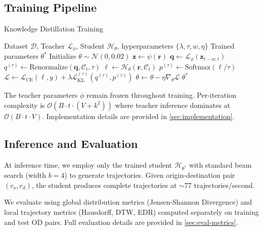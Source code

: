 \subsection{Training Pipeline}
\label{sec:method-training}

\begin{algorithm}[t]
    \caption{Knowledge Distillation Training}
    \label{alg:distillation}
    \begin{algorithmic}[1]
        \Require Dataset $\mathcal{D}$, Teacher $\mathcal{L}_\phi$, Student $\mathcal{H}_\theta$, hyperparameters $\{\lambda, \tau, w, \eta\}$
        \Ensure Trained parameters $\theta^*$
        \State Initialize $\theta \sim \mathcal{N}(0, 0.02)$
        \State $\mathbf{z} \gets \psi(\mathbf{r})$ 
        \State $\mathbf{q} \gets \mathcal{L}_\phi(\mathbf{z}_{t-w:t})$ 
        \State $q^{(\tau)} \gets \text{Renormalize}(\mathbf{q}, \mathcal{C}_t, \tau)$ 
        \State $\boldsymbol{\ell} \gets \mathcal{H}_\theta(\mathbf{r}, \mathcal{C}_t)$ 
        \State $p^{(\tau)} \gets \text{Softmax}(\boldsymbol{\ell} / \tau)$
        \State $\mathcal{L} \gets \mathcal{L}_{\text{CE}}(\boldsymbol{\ell}, y) + \lambda \mathcal{L}_{\text{KL}}^{(\tau)}(q^{(\tau)}, p^{(\tau)})$
        \State $\theta \gets \theta - \eta \nabla_\theta \mathcal{L}$
        \EndFor
        \EndFor
        \State \Return $\theta^*$
    \end{algorithmic}
\end{algorithm}

The teacher parameters $\phi$ remain frozen throughout training. Per-iteration complexity is $\mathcal{O}(B \cdot t \cdot (V + k^2))$ where teacher inference dominates at $\mathcal{O}(B \cdot t \cdot V)$. Implementation details are provided in \autoref{sec:implementation}.

\subsection{Inference and Evaluation}
\label{sec:method-inference}

At inference time, we employ only the trained student $\mathcal{H}_{\theta^*}$ with standard beam search (width $b=4$) to generate trajectories. Given origin-destination pair $(r_o, r_d)$, the student produces complete trajectories at $\sim$77 trajectories/second.

We evaluate using global distribution metrics (Jensen-Shannon Divergence) and local trajectory metrics (Hausdorff, DTW, EDR) computed separately on training and test OD pairs. Full evaluation details are provided in \autoref{sec:eval-metrics}.